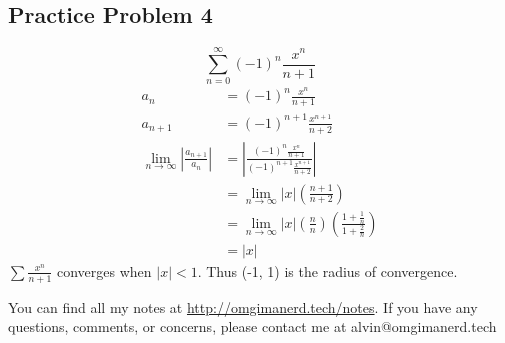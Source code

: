 \documentclass{math}
\begin{document}
\subsection*{Practice Problem 4}
\[ \sum_{n=0}^{\infty}(-1)^{n}\frac{x^{n}}{n+1} \]
\begin{align*}
  a_{n} &= (-1)^{n}\frac{x^{n}}{n+1} \\
  a_{n+1} &= (-1)^{n+1}\frac{x^{n+1}}{n+2} \\
  \lim_{n\to\infty}|\frac{a_{n+1}}{a_{n}}| &=
    |\frac{(-1)^{n}\frac{x^{n}}{n+1}}{(-1)^{n+1}\frac{x^{n+1}}{n+2}}| \\
  &= \lim_{n\to\infty}|x|(\frac{n+1}{n+2}) \\
  &= \lim_{n\to\infty}|x|(\frac{n}{n})(\frac{1+\frac{1}{n}}{1+\frac{2}{n}}) \\
  &= |x|
\end{align*}
\( \sum\frac{x^{n}}{n+1} \) converges when \( |x| < 1 \). Thus (-1, 1)
is the radius of convergence.

\begin{center}
  You can find all my notes at \url{http://omgimanerd.tech/notes}. If you have
  any questions, comments, or concerns, please contact me at
  alvin@omgimanerd.tech
\end{center}
\end{document}
